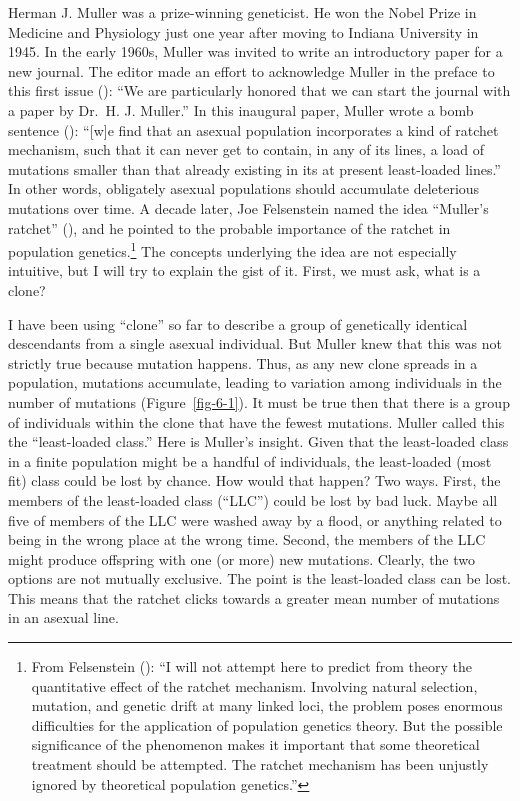 \documentclass[
  letterpaper,
]{book}
\begin{document}
Herman J. Muller was a prize-winning geneticist. He won the Nobel Prize
in Medicine and Physiology just one year after moving to Indiana
University in 1945. In the early 1960s, Muller was invited to write an
introductory paper for a new journal. The editor made an effort to
acknowledge Muller in the preface to this first issue
(): ``We are particularly honored
that we can start the journal with a paper by Dr.~H. J. Muller.'' In
this inaugural paper, Muller wrote a bomb sentence
(): ``{[}w{]}e find that an asexual
population incorporates a kind of ratchet mechanism, such that it can
never get to contain, in any of its lines, a load of mutations smaller
than that already existing in its at present least-loaded lines.'' In
other words, obligately asexual populations should accumulate
deleterious mutations over time. A decade later, Joe Felsenstein named
the idea ``Muller's ratchet'' (),
and he pointed to the probable importance of the ratchet in population
genetics.\footnote{From Felsenstein
  (): ``I will not attempt here to
  predict from theory the quantitative effect of the ratchet mechanism.
  Involving natural selection, mutation, and genetic drift at many
  linked loci, the problem poses enormous difficulties for the
  application of population genetics theory. But the possible
  significance of the phenomenon makes it important that some
  theoretical treatment should be attempted. The ratchet mechanism has
  been unjustly ignored by theoretical population genetics.''} The
concepts underlying the idea are not especially intuitive, but I will
try to explain the gist of it. First, we must ask, what is a clone?

I have been using ``clone'' so far to describe a group of genetically
identical descendants from a single asexual individual. But Muller knew
that this was not strictly true because mutation happens. Thus, as any
new clone spreads in a population, mutations accumulate, leading to
variation among individuals in the number of mutations
(Figure~\ref{fig-6-1}). It must be true then that there is a group of
individuals within the clone that have the fewest mutations. Muller
called this the ``least-loaded class.'' Here is Muller's insight. Given
that the least-loaded class in a finite population might be a handful of
individuals, the least-loaded (most fit) class could be lost by chance.
How would that happen? Two ways. First, the members of the least-loaded
class (``LLC'') could be lost by bad luck. Maybe all five of members of
the LLC were washed away by a flood, or anything related to being in the
wrong place at the wrong time. Second, the members of the LLC might
produce offspring with one (or more) new mutations. Clearly, the two
options are not mutually exclusive. The point is the least-loaded class
can be lost. This means that the ratchet clicks towards a greater mean
number of mutations in an asexual line.
\end{document}
